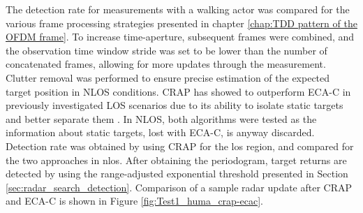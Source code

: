 The detection rate for measurements with a walking actor was compared for the various frame processing strategies presented in chapter \ref{chap:TDD pattern of the OFDM frame}. To increase time-aperture, subsequent frames were combined, and the observation time window stride was set to be lower than the number 
of concatenated frames, allowing for more updates through the measurement.
Clutter removal was performed to ensure precise estimation of the expected target position in NLOS conditions. 
CRAP has showed to outperform ECA-C in previously investigated LOS scenarios due to its ability to isolate static targets and better separate them \cite{Henninger_CRAP_2023}.
In NLOS, both algorithms were tested as the information about static targets, lost with ECA-C, is anyway discarded.
Detection rate was obtained by using CRAP for the \gls{los} region, and compared for the two approaches in \gls{nlos}.
After obtaining the periodogram, target returns are detected by using the range-adjusted exponential threshold presented in Section \ref{sec:radar_search_detection}.
Comparison of a sample radar update after CRAP and ECA-C is shown in Figure \ref{fig:Test1_huma_crap-ecac}.


